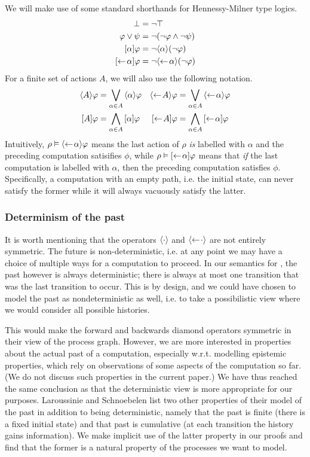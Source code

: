 We will make use of some standard shorthands for Hennessy-Milner type logics.
\begin{align*}
    \bot &= \neg\top \\
    \varphi \lor \psi &= \neg(\neg\varphi \land \neg\psi) \\
    \mbox{\ensuremath{[\alpha]}}\varphi &= \neg\mbox{\ensuremath{\langle \alpha \rangle}}(\neg\varphi) \\
    \mbox{\ensuremath{[\leftarrow\! \alpha]}}\varphi &= \neg\mbox{\ensuremath{\langle\leftarrow\! \alpha \rangle}}(\neg\varphi) \\
\end{align*}
For a finite set of actions $A$, we will also use the following notation.
\begin{align*}
    \mbox{\ensuremath{\langle A \rangle}}\varphi &= \bigvee_{\alpha\in A} \mbox{\ensuremath{\langle \alpha \rangle}} \varphi  &
    \mbox{\ensuremath{\langle\leftarrow\! A \rangle}}\varphi &= \bigvee_{\alpha\in A} \mbox{\ensuremath{\langle\leftarrow\! \alpha \rangle}} \varphi \\
    \mbox{\ensuremath{[A]}}\varphi &= \bigwedge_{\alpha\in A} \mbox{\ensuremath{[\alpha]}} \varphi  &
    \mbox{\ensuremath{[\leftarrow\! A]}}\varphi &= \bigwedge_{\alpha\in A} \mbox{\ensuremath{[\leftarrow\! \alpha]}} \varphi \\
\end{align*}
Intuitively, $\rho\vDash\mbox{\ensuremath{\langle\leftarrow\! \alpha \rangle}}\varphi$ means the last action of $\rho$
{\em is} labelled with $\alpha$ and the preceding computation satisifies $\phi$, while
$\rho\vDash\mbox{\ensuremath{[\leftarrow\! \alpha]}}\varphi$ means that {\em if} the last computation is labelled
with $\alpha$, then the preceding computation satisfies $\phi$. Specifically, a
computation with an empty path, i.e. the initial state, can never satisfy the former
while it will always vacuously satisfy the latter.

\subsubsection{Determinism of the past}
\label{sec:determinism_of_the_past}

It is worth mentioning that the operators $\mbox{\ensuremath{\langle \cdot \rangle}}$ and $\mbox{\ensuremath{\langle\leftarrow\! \cdot \rangle}}$ are
not entirely symmetric. The future is non-deterministic, i.e. at any point we may
have a choice of multiple ways for a computation to proceed. 
In our semantics for \HMLpast{}, the past however is
always deterministic; there is always at most one transition that was the last
transition to occur. This is by design, and we could have chosen to model the past
as nondeterministic as well, i.e. to take a possibilistic view where we would consider
all possible histories. 

This would make the forward and backwards diamond
operators symmetric in their view of the process graph. However, we are more
interested in properties about the actual past of a computation, especially
w.r.t. modelling epistemic properties, which rely on observations of some aspects
of the computation so far. (We do not discuss such properties in the
current paper.) We have thus reached the same conclusion as \cite{Laroussinie00}
that the deterministic view is more appropriate for our purposes.
Laroussinie and Schnoebelen list two other
properties of their model of the past in addition to being deterministic, namely that
the past is finite (there is a fixed initial state) and that past is cumulative (at each
transition the history gains information). We make implicit use of the latter property 
in our proofs and find that the former is a natural property of the processes we
want to model.

